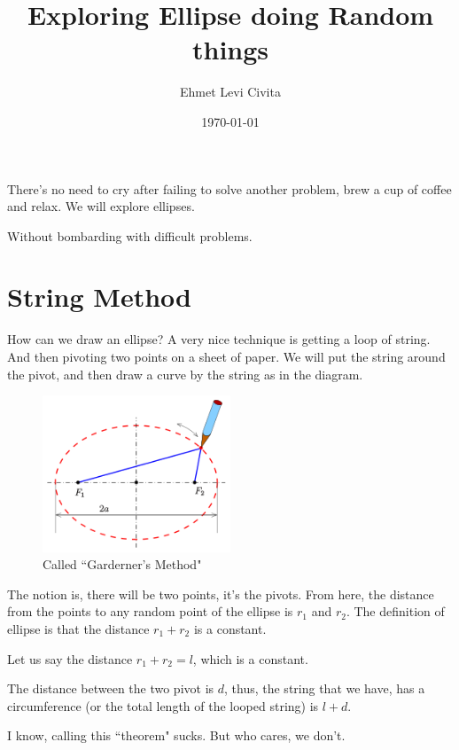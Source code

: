 \documentclass[12pt,a4paper]{article}
\title{Exploring Ellipse doing Random things}
\author{Ehmet Levi Civita}
\date{\today}
\begin{document}
\maketitle

There's no need to cry after failing to solve another problem, brew a cup of coffee and relax. We will explore ellipses.

Without bombarding with difficult problems. 
\section{ String Method }
How can we draw an ellipse? A very nice technique is getting a loop of string. And then pivoting two points on a sheet of paper. We will put the string around the pivot,
and then draw a curve by the string as in the diagram.
\begin{figure}[ht!]
    \centering
    \includegraphics[width=0.5\textwidth]{Elliko-g.svg.png}
    \caption{ Called ``Garderner's Method" }
    \label{fig:}
\end{figure}

The notion is, there will be two points, it's the pivots. From here, the distance from the points to any random point of the ellipse is $r_1$ and $r_2$. The definition of ellipse is that the distance $r_1 + r_2$ is a constant. 

Let us say the distance $r_1 + r_2 = l$, which is a constant. 

The distance between the two pivot is $d$, thus, the string that we have, has a circumference (or the total length of the looped string) is $l + d$. 


I know, calling this ``theorem" sucks. But who cares, we don't. 
\end{document}

